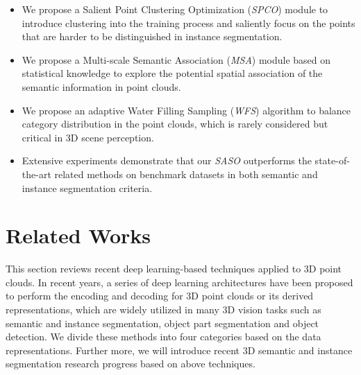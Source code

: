 \documentclass{cta-author}
\begin{document}
\begin{itemize}
\item We propose a Salient Point Clustering Optimization (\textit{SPCO}) module to introduce clustering into the training process and saliently focus on the points that are harder to be distinguished in instance segmentation.
\item We propose a Multi-scale Semantic Association (\textit{MSA}) module based on statistical knowledge to explore the potential spatial association of the semantic information in point clouds.
\item We propose an adaptive Water Filling Sampling (\textit{WFS}) algorithm to balance category distribution in the point clouds, which is rarely considered but critical in 3D scene perception. 
\item Extensive experiments demonstrate that our \textit{SASO} outperforms the state-of-the-art related methods on benchmark datasets in both semantic and instance segmentation criteria.
\end{itemize}
\section{Related Works}\label{sec2}
This section reviews recent deep learning-based techniques applied to 3D point clouds. In recent years, a series of deep learning architectures have been proposed to perform the encoding and decoding for 3D point clouds or its derived representations, which are widely utilized in many 3D vision tasks such as semantic and instance segmentation, object part segmentation and object detection. We divide these methods into four categories based on the data representations. Further more, we will introduce recent 3D semantic and instance segmentation research progress based on above techniques.
\end{document}
